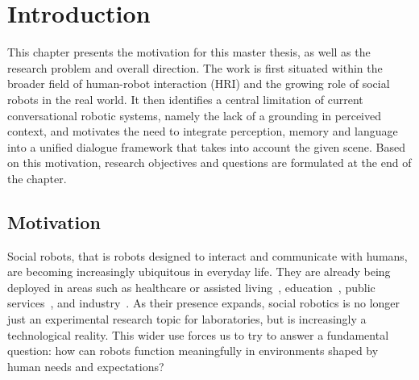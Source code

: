 \chapter{Introduction}\label{chap:intro}
This chapter presents the motivation for this master thesis, as well as the research problem and overall direction.
The work is first situated within the broader field of human-robot interaction (HRI) and the growing role of social robots in the real world.
It then identifies a central limitation of current conversational robotic systems, namely the lack of a grounding in perceived context, and motivates the need to integrate perception, memory and language into a unified dialogue framework that takes into account the given scene.
Based on this motivation, research objectives and questions are formulated at the end of the chapter.

\section{Motivation}


Social robots, that is robots designed to interact and communicate with humans, are becoming increasingly ubiquitous in everyday life.
They are already being deployed in areas such as healthcare or assisted living~\cite{Han2024HRIHealthcare, liao_use_2023}, education~\cite{latif_physicsassistant_2024,sievers_humanoid_2025}, public services~\cite{horak_v_2018}, and industry~\cite{brad_retrieval-augmented_2025}.
As their presence expands, social robotics is no longer just an experimental research topic for laboratories, but is increasingly a technological reality.
This wider use forces us to try to answer a fundamental question: how can robots function meaningfully in environments shaped by human needs and expectations?


